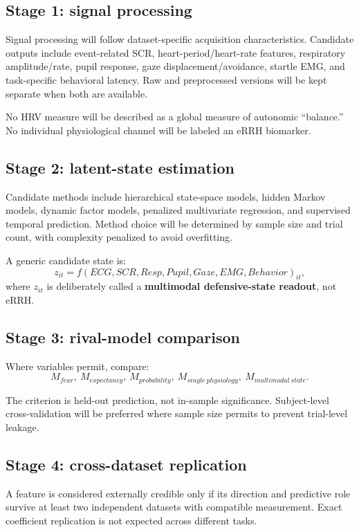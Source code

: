 \documentclass[11pt]{article}
\begin{document}
\subsection{Stage 1: signal processing}
Signal processing will follow dataset-specific acquisition characteristics. Candidate outputs include event-related SCR, heart-period/heart-rate features, respiratory amplitude/rate, pupil response, gaze displacement/avoidance, startle EMG, and task-specific behavioral latency. Raw and preprocessed versions will be kept separate when both are available.

No HRV measure will be described as a global measure of autonomic ``balance.'' No individual physiological channel will be labeled an eRRH biomarker.

\subsection{Stage 2: latent-state estimation}
Candidate methods include hierarchical state-space models, hidden Markov models, dynamic factor models, penalized multivariate regression, and supervised temporal prediction. Method choice will be determined by sample size and trial count, with complexity penalized to avoid overfitting.

A generic candidate state is:
\[
z_{it}=f(ECG,SCR,Resp,Pupil,Gaze,EMG,Behavior)_{it},
\]
where $z_{it}$ is deliberately called a \textbf{multimodal defensive-state readout}, not eRRH.

\subsection{Stage 3: rival-model comparison}
Where variables permit, compare:
\[
M_{fear},\ M_{expectancy},\ M_{probability},\ M_{single\ physiology},\ M_{multimodal\ state}.
\]

The criterion is held-out prediction, not in-sample significance. Subject-level cross-validation will be preferred where sample size permits to prevent trial-level leakage.

\subsection{Stage 4: cross-dataset replication}
A feature is considered externally credible only if its direction and predictive role survive at least two independent datasets with compatible measurement. Exact coefficient replication is not expected across different tasks.
\end{document}
